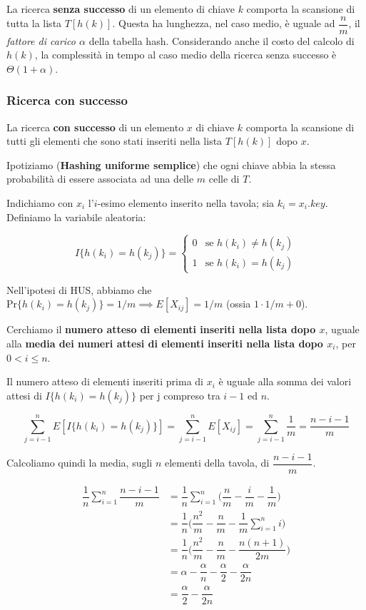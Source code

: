\documentclass[a4paper,10pt]{article}
\theoremstyle{definition}
\begin{document}
La ricerca \textbf{senza successo} di un elemento di chiave $k$ comporta la scansione di tutta la lista $T[h(k)]$. Questa ha lunghezza, nel caso medio, è uguale ad $\dfrac{n}{m}$, il \emph{fattore di carico $\alpha$} della tabella hash. Considerando anche il costo del calcolo di $h(k)$, la complessità in tempo al caso medio della ricerca senza successo è $\Theta(1+ \alpha)$.\bigskip

\subsubsection{Ricerca con successo}
La ricerca \textbf{con successo} di un elemento $x$ di chiave $k$ comporta la scansione di tutti gli elementi che sono stati inseriti nella lista $T[h(k)]$ dopo $x$.\bigskip

Ipotiziamo (\textbf{Hashing uniforme semplice}) che ogni chiave abbia la stessa probabilità di essere associata ad una delle $m$ celle di $T$.

Indichiamo con $x_i$ l'$i$-esimo elemento inserito nella tavola; sia $k_i = x_i.key$. Definiamo la variabile aleatoria:

\[I\{h(k_i) = h(k_j)\} = \begin{cases}
       0 & \text{se $h(k_i) \neq h(k_j)$}\\
       1 & \text{se $h(k_i) = h(k_j)$}
      \end{cases}
\]

Nell'ipotesi di HUS, abbiamo che $\text{Pr}\{h(k_i) = h(k_j)\} = 1/m \implies E[X_{ij}] = 1/m$ (ossia $1\cdot1/m + 0$).\bigskip

Cerchiamo il \textbf{numero atteso di elementi inseriti nella lista dopo $x$}, uguale alla\textbf{ media dei numeri attesi di elementi inseriti nella lista dopo $x_i$}, per $0 < i \leq n$.

Il numero atteso di elementi inseriti prima di $x_i$ è uguale alla somma dei valori attesi di $I\{h(k_i) = h(k_j)\}$ per j compreso tra $i-1$ ed $n$. 

\[\sum\limits_{j = i-1}^n E[I\{h(k_i) = h(k_j)\}] = \sum\limits_{j = i-1}^n E[X_{ij}] = \sum\limits_{j = i-1}^n \dfrac{1}{m} = \dfrac{n-i-1}{m} \]

Calcoliamo quindi la media, sugli $n$ elementi della tavola, di $\dfrac{n-i-1}{m}$.

\[\begin{aligned}
    \dfrac{1}{n}\sum\limits_{i = 1}^n\dfrac{n-i-1}{m} &= \dfrac{1}{n}\sum\limits_{i = 1}^n\bigg(\dfrac{n}{m} - \dfrac{i}{m} -\dfrac{1}{m}\bigg) \\
    &= \dfrac{1}{n}\bigg(\dfrac{n^2}{m} - \dfrac{n}{m}-\dfrac{1}{m}\sum\limits_{i = 1}^ni\bigg)\\
    &= \dfrac{1}{n}\bigg(\dfrac{n^2}{m} - \dfrac{n}{m}-\dfrac{n(n+1)}{2m}\bigg)\\
    &= \alpha - \dfrac{\alpha}{n} - \dfrac{\alpha}{2} - \dfrac{\alpha}{2n}\\
    &= \dfrac{\alpha}{2} - \dfrac{\alpha}{2n}
  \end{aligned}\]
\end{document}
